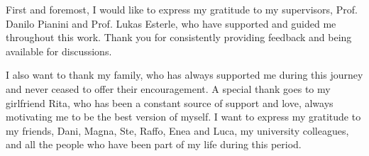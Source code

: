 \documentclass[12pt,a4paper,openright,twoside]{book}
\begin{document}

\backmatter





\begin{acknowledgements}
First and foremost, I would like to express my gratitude to my supervisors, Prof. Danilo Pianini and Prof. Lukas Esterle, who have supported and guided me throughout this work. 
Thank you for consistently providing feedback and being available for discussions.

I also want to thank my family, who has always supported me during this journey and never ceased to offer their encouragement.
A special thank goes to my girlfriend Rita, who has been a constant source of support and love, always motivating me to be the best version of myself.
I want to express my gratitude to my friends, Dani, Magna, Ste, Raffo, Enea and Luca, my university colleagues, and all the people who have been part of my life during this period.
\end{acknowledgements}
\end{document}
